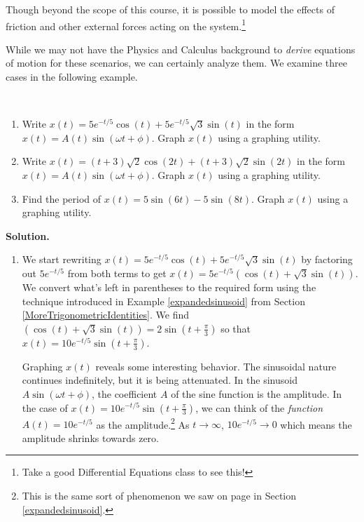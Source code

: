 Though beyond the scope of this course, it is possible  to model the effects of friction and other external forces acting on the system.\footnote{Take a good Differential Equations class to see this!}  

\smallskip

While we may not have the Physics and Calculus background to \textit{derive} equations of motion for these scenarios, we can certainly analyze them.  We examine three cases in the following example.

\newpage

\begin{ex} \label{underdampedresonance}  $~$  

\begin{enumerate}

\item  Write $x(t) = 5e^{-t/5} \cos(t) + 5e^{-t/5} \sqrt{3} \sin(t)$ in the form $x(t) = A(t) \sin(\omega t + \phi)$.  Graph $x(t)$ using a graphing utility.

\item  Write $x(t) = (t+3)\sqrt{2} \cos(2t) + (t+3) \sqrt{2} \sin(2t)$ in the form $x(t) = A(t) \sin(\omega t + \phi)$.  Graph $x(t)$  using a graphing utility.

\item  Find the period of $x(t) = 5\sin(6t) - 5\sin\left(8t\right)$.  Graph $x(t)$ using a graphing utility.

\end{enumerate}

{\bf Solution.}

\begin{enumerate}

\item  We start rewriting  $x(t) = 5e^{-t/5} \cos(t) + 5e^{-t/5} \sqrt{3} \sin(t)$ by factoring out   $5e^{-t/5}$ from both terms to get  $x(t) = 5e^{-t/5} \left( \cos(t) + \sqrt{3} \sin(t)\right)$. We convert what's left in parentheses to the required form using the technique introduced in Example  \ref{expandedsinusoid} from Section \ref{MoreTrigonometricIdentities}.  We find $\left( \cos(t) + \sqrt{3} \sin(t)\right) = 2\sin\left(t+\frac{\pi}{3}\right)$ so that $x(t) = 10e^{-t/5} \sin\left(t + \frac{\pi}{3}\right)$.    


\smallskip

Graphing $x(t)$ reveals some interesting behavior.  The sinusoidal nature continues indefinitely, but it is being attenuated.  In the sinusoid $A \sin(\omega t + \phi)$, the coefficient $A$ of the sine function is the amplitude.  In the case of $x(t) = 10e^{-t/5} \sin\left(t + \frac{\pi}{3}\right)$, we can think of the \textit{function} $A(t) = 10e^{-t/5}$ as the amplitude.\footnote{This is the same sort of phenomenon we saw on page \pageref{beats} in Section \ref{expandedsinusoid}.}  As $t \rightarrow \infty$, $10e^{-t/5} \rightarrow 0$ which means the amplitude shrinks towards zero. 


\end{enumerate}
\end{ex}

